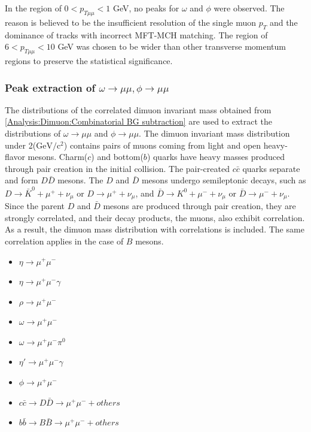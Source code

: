                 In the region of \(0 < p_{T\mu\mu} < 1\) GeV, no peaks for \(\omega\) and \(\phi\) were observed. The reason is believed to be the insufficient resolution of the single muon \(p_T\) and the dominance of tracks with incorrect MFT-MCH matching.
                The region of \(6 < p_{T\mu\mu} < 10\) GeV was chosen to be wider than other transverse momentum regions to preserve the statistical significance.
        
            \subsubsection{Peak extraction of $\omega \rightarrow \mu\mu ,\phi \rightarrow \mu\mu$}
            \label{Peak_extraction}
                The distributions of the correlated dimuon invariant mass obtained from \ref{Analysis:Dimuon:Combinatorial BG subtraction} are used to extract the distributions of $\omega \rightarrow \mu\mu$ and $\phi \rightarrow \mu\mu$. The dimuon invariant mass distribution under 2($\mathrm{GeV/c^2}$) contains pairs of muons coming from light and open heavy-flavor mesons. Charm($c$) and bottom($b$) quarks have heavy masses produced through pair creation in the initial collision. The pair-created \(c\bar{c}\) quarks separate and form \(D\bar{D}\) mesons. The \(D\) and \(\bar{D}\) mesons undergo semileptonic decays, such as \(D \rightarrow \bar{K}^0 + \mu^+ + \nu_\mu\) or \(D \rightarrow \mu^+ + \nu_\mu\), and \(\bar{D} \rightarrow K^0 + \mu^- + \nu_\mu\) or \(\bar{D} \rightarrow \mu^- + \nu_\mu\). Since the parent \(D\) and \(\bar{D}\) mesons are produced through pair creation, they are strongly correlated, and their decay products, the muons, also exhibit correlation. As a result, the dimuon mass distribution with correlations is included. The same correlation applies in the case of \(B\) mesons.
                \begin{itemize}
                    \item $\eta \rightarrow \mu^+ \mu^-$
                    \item $\eta \rightarrow \mu^+ \mu^- \gamma$
                    \item $\rho \rightarrow \mu^+ \mu^-$
                    \item $\omega \rightarrow \mu^+ \mu^-$
                    \item $\omega \rightarrow \mu^+ \mu^- \pi^0$
                    \item $\eta' \rightarrow \mu^+ \mu^- \gamma$
                    \item $\phi \rightarrow \mu^+ \mu^-$
                    \item $c\bar{c} \rightarrow D\bar{D} \rightarrow \mu^+ \mu^- + others$
                    \item $b\bar{b} \rightarrow B\bar{B} \rightarrow \mu^+ \mu^- + others$
                \end{itemize}
